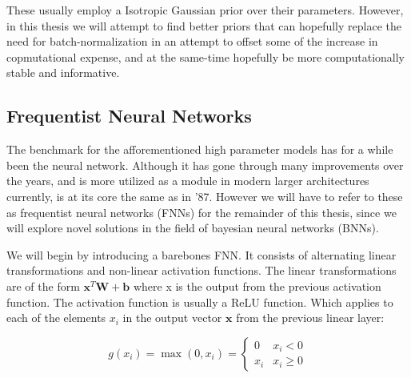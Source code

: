 \documentclass[nofootinbib,UKenglish,nobalancelastpage,12pt]{article}
\begin{document}
These usually employ a Isotropic Gaussian prior over their parameters. However, in this thesis we will attempt to find better priors that can hopefully replace the need for batch-normalization in an attempt to offset some of the increase in copmutational expense, and at the same-time hopefully be more computationally stable and informative.
\clearpage
\subsection{Frequentist Neural Networks}

The benchmark for the afforementioned high parameter models has for a while been the neural network. Although it has gone through many improvements over the years, and is more utilized as a module in modern larger architectures currently, is at its core the same as in '87. \cite{LeCun1987} However we will have to refer to these as frequentist neural networks (FNNs) for the remainder of this thesis, since we will explore novel solutions in the field of bayesian neural networks (BNNs).

We will begin by introducing a barebones FNN. It consists of alternating linear transformations and non-linear activation functions. The linear transformations are of the form $\textbf{x}^T\textbf{W}+\textbf{b}$ where x is the output from the previous activation function. The activation function is usually a ReLU function. Which applies to each of the elements $x_{i}$ in the output vector $\textbf{x}$ from the previous linear layer:

$$
g(x_{i}) = \max(0,x_{i}) =
\begin{cases}
0 & x_{i} < 0 \\
x_{i} & x_{i} \geq 0
\end{cases}
$$
\end{document}

